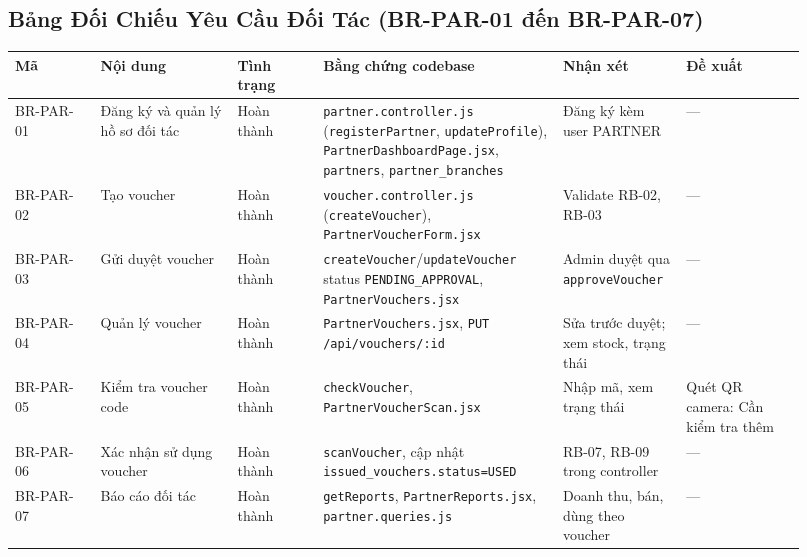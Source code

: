 \subsection{Bảng Đối Chiếu Yêu Cầu Đối Tác (BR-PAR-01 đến BR-PAR-07)}
\begin{longtable}{>{\raggedright\arraybackslash}p{0.10\linewidth}>{\raggedright\arraybackslash}p{0.16\linewidth}>{\raggedright\arraybackslash}p{0.10\linewidth}>{\raggedright\arraybackslash}p{0.28\linewidth}>{\raggedright\arraybackslash}p{0.14\linewidth}>{\raggedright\arraybackslash}p{0.14\linewidth}}
\toprule
\textbf{Mã} & \textbf{Nội dung} & \textbf{Tình trạng} & \textbf{Bằng chứng codebase} & \textbf{Nhận xét} & \textbf{Đề xuất}\\
\midrule
\endhead
BR-PAR-01 & Đăng ký và quản lý hồ sơ đối tác & Hoàn thành & \texttt{partner.controller.js} (\texttt{registerPartner}, \texttt{updateProfile}), \texttt{PartnerDashboardPage.jsx}, \texttt{partners}, \texttt{partner\_branches} & Đăng ký kèm user PARTNER & —\\
BR-PAR-02 & Tạo voucher & Hoàn thành & \texttt{voucher.controller.js} (\texttt{createVoucher}), \texttt{PartnerVoucherForm.jsx} & Validate RB-02, RB-03 & —\\
BR-PAR-03 & Gửi duyệt voucher & Hoàn thành & \texttt{createVoucher}/\texttt{updateVoucher} status \texttt{PENDING\_APPROVAL}, \texttt{PartnerVouchers.jsx} & Admin duyệt qua \texttt{approveVoucher} & —\\
BR-PAR-04 & Quản lý voucher & Hoàn thành & \texttt{PartnerVouchers.jsx}, \texttt{PUT /api/vouchers/:id} & Sửa trước duyệt; xem stock, trạng thái & —\\
BR-PAR-05 & Kiểm tra voucher code & Hoàn thành & \texttt{checkVoucher}, \texttt{PartnerVoucherScan.jsx} & Nhập mã, xem trạng thái & Quét QR camera: Cần kiểm tra thêm\\
BR-PAR-06 & Xác nhận sử dụng voucher & Hoàn thành & \texttt{scanVoucher}, cập nhật \texttt{issued\_vouchers.status=USED} & RB-07, RB-09 trong controller & —\\
BR-PAR-07 & Báo cáo đối tác & Hoàn thành & \texttt{getReports}, \texttt{PartnerReports.jsx}, \texttt{partner.queries.js} & Doanh thu, bán, dùng theo voucher & —\\
\bottomrule
\end{longtable}

